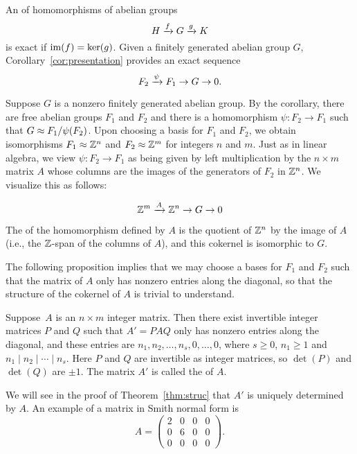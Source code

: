  An  of homomorphisms of abelian groups
$$H \xrightarrow{f} G \xrightarrow{g} K$$
is exact if  $\operatorname{im}(f) = \ker(g)$.
Given a finitely generated abelian group $G$, Corollary~\ref{cor:presentation} 
provides an exact sequence
$$
  F_2 \xrightarrow{\psi} F_1 \to G \to 0.
$$

Suppose $G$ is a nonzero finitely generated abelian group.  By the
corollary, there are free abelian groups $F_1$ and $F_2$ and there is a
homomorphism $\psi:F_2 \to F_1$ such that $G\approx F_1/\psi(F_2)$.
Upon choosing a basis for $F_1$ and $F_2$, we obtain isomorphisms
$F_1\approx \mathbb{Z}^n$ and $F_2\approx \mathbb{Z}^m$ for integers $n$ and $m$.
Just as in linear algebra, we
 view $\psi:F_2\to F_1$ as being given by left multiplication
by the $n\times m$ matrix $A$ whose columns are the images of the
generators of $F_2$ in $\mathbb{Z}^n$.  We visualize this as follows:

$$
\mathbb{Z}^m \xrightarrow{A} \mathbb{Z}^n \to G \to 0
$$

The  of the
homomorphism defined by $A$ is the quotient of $\mathbb{Z}^n$ by the image of $A$ (i.e., the
$\mathbb{Z}$-span of the columns of $A$), and this cokernel is isomorphic to
$G$.  

The following proposition implies that we may choose a bases for $F_1$
and $F_2$ such that the matrix of $A$ only has nonzero entries along
the diagonal, so that the structure of the cokernel of $A$ is
trivial to understand.

\begin{proposition}\label{prop:smith}
Suppose~$A$ is an $n\times m$ integer matrix.  Then there exist
invertible integer matrices $P$ and $Q$ such that $A'=PAQ$ only
has nonzero entries along the diagonal, and these entries are
$n_1, n_2,\ldots, n_s,0,\ldots,0$, where
$s\geq 0$, $n_1\geq 1$ and $n_1\mid n_2 \mid{} \cdots \mid{} n_s$.  
Here $P$ and $Q$ are invertible as integer matrices, so $\det(P)$
and $\det(Q)$ are $\pm 1$.
The matrix $A'$ is called the  of $A$.
\end{proposition}
We will see in the proof of Theorem~\ref{thm:struc} that
$A'$ is uniquely determined by $A$.
An example of a matrix in Smith normal form is 
$$
A=\left(
        \begin{matrix}2&0&0&0\\0&6&0&0\\0&0&0&0
        \end{matrix}\right).
$$

